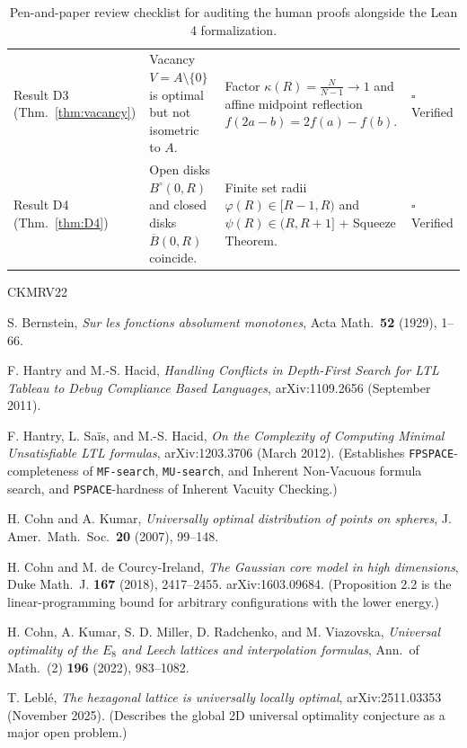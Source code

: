 \documentclass[11pt, a4paper]{article}
\theoremstyle{definition}
\theoremstyle{remark}
\newcommand{\Bbar}{\overline{B}}
\newcommand{\Bopen}{B^{\circ}}
\begin{document}
\begin{table}[htbp]
\begin{tabular}{@{}>{\raggedright\arraybackslash}p{2.2cm}>{\raggedright\arraybackslash}p{5.0cm}>{\raggedright\arraybackslash}p{5.2cm}>{\raggedright\arraybackslash}p{2.8cm}@{}}
Result D3 (Thm.~\ref{thm:vacancy}) & Vacancy $V = A \setminus \{0\}$ is optimal but not isometric to $A$. & Factor $\kappa(R) = \frac{N}{N-1} \to 1$ and affine midpoint reflection $f(2a-b) = 2f(a)-f(b)$. & $\square$ Verified \\[0.6em]
Result D4 (Thm.~\ref{thm:D4}) & Open disks $\Bopen(0, R)$ and closed disks $\Bbar(0, R)$ coincide. & Finite set radii $\varphi(R) \in [R-1, R)$ and $\psi(R) \in (R, R+1]$ + Squeeze Theorem. & $\square$ Verified \\
\bottomrule
\end{tabular}
\caption{Pen-and-paper review checklist for auditing the human proofs alongside the Lean 4 formalization.}
\end{table}

\begin{thebibliography}{CKMRV22}

 S. Bernstein, \emph{Sur les fonctions absolument monotones}, Acta Math.\ \textbf{52} (1929), 1--66.

 F. Hantry and M.-S. Hacid, \emph{Handling Conflicts in Depth-First Search for LTL Tableau to Debug Compliance Based Languages}, arXiv:1109.2656 (September 2011).

 F. Hantry, L. Sa\"is, and M.-S. Hacid, \emph{On the Complexity of Computing Minimal Unsatisfiable LTL formulas}, arXiv:1203.3706 (March 2012). (Establishes \texttt{FPSPACE}-completeness of \texttt{MF-search}, \texttt{MU-search}, and Inherent Non-Vacuous formula search, and \texttt{PSPACE}-hardness of Inherent Vacuity Checking.)

 H. Cohn and A. Kumar, \emph{Universally optimal distribution of points on spheres}, J. Amer.\ Math.\ Soc.\ \textbf{20} (2007), 99--148.

 H. Cohn and M. de Courcy-Ireland, \emph{The Gaussian core model in high dimensions}, Duke Math.\ J. \textbf{167} (2018), 2417--2455. arXiv:1603.09684. (Proposition 2.2 is the linear-programming bound for arbitrary configurations with the lower energy.)

 H. Cohn, A. Kumar, S. D. Miller, D. Radchenko, and M. Viazovska, \emph{Universal optimality of the $E_8$ and Leech lattices and interpolation formulas}, Ann.\ of Math.\ (2) \textbf{196} (2022), 983--1082.

 T. Lebl\'e, \emph{The hexagonal lattice is universally locally optimal}, arXiv:2511.03353 (November 2025). (Describes the global 2D universal optimality conjecture as a major open problem.)


\end{thebibliography}
\end{document}
